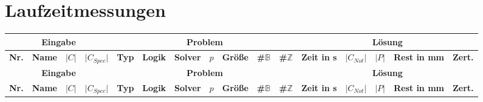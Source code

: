 \section{Laufzeitmessungen}
\begin{landscape}
    \begin{longtable}{|c|c|c|c|c|l|c|c|c|c|c|c|c|c|c|c|}
            \hline
            \multicolumn{4}{|c|}{\textbf{Eingabe}} & \multicolumn{7}{c|}{\textbf{Problem}} & \multicolumn{5}{c|}{\textbf{Lösung}} \\
            \hline
            \textbf{Nr.} & \textbf{Name} & \textbf{$\lvert C \rvert$} & \textbf{$\lvert C_{Spec} \rvert$} & \textbf{Typ} & \textbf{Logik} & \textbf{Solver} & \textbf{$p$} & \textbf{Größe} & \textbf{\#$\mathbb{B}$} & \textbf{\#$\mathbb{Z}$} & \textbf{Zeit in s} & \textbf{$\lvert C_{Not} \rvert$} & \textbf{$\lvert P \rvert$} & \textbf{Rest in mm} & \textbf{Zert.} \\
            \hline
            \endfirsthead

            \hline
            \multicolumn{4}{|c|}{\textbf{Eingabe}} & \multicolumn{7}{c|}{\textbf{Problem}} & \multicolumn{5}{c|}{\textbf{Lösung}} \\
            \hline
            \textbf{Nr.} & \textbf{Name} & \textbf{$\lvert C \rvert$} & \textbf{$\lvert C_{Spec} \rvert$} & \textbf{Typ} & \textbf{Logik} & \textbf{Solver} & \textbf{$p$} & \textbf{Größe} & \textbf{\#$\mathbb{B}$} & \textbf{\#$\mathbb{Z}$} & \textbf{Zeit in s} & \textbf{$\lvert C_{Not} \rvert$} & \textbf{$\lvert P \rvert$} & \textbf{Rest in mm} & \textbf{Zert.} \\
            \hline
            \endhead


\end{longtable}
\end{landscape}
